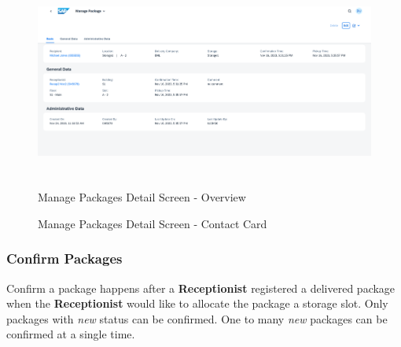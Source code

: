 \begin{figure}[H]
	\centering
	\includegraphics[height=200pt]{images/user_doc/managePack/DetailScreen/browse/overview.png}
	\caption{Manage Packages Detail Screen - Overview}
	\label{fig:MPReportCOntactCard}
\end{figure}

\begin{figure}[H]
	\centering
	\hspace{5pt}
    \caption{Manage Packages Detail Screen - Contact Card}
	\label{fig:MPObjectContactCard}
\end{figure}

\subsubsection{Confirm Packages}

Confirm a package happens after a \textbf{Receptionist} registered a delivered package when the \textbf{Receptionist} would like to allocate the package a storage slot. Only packages with \textit{new} status can be confirmed. One to many \textit{new} packages can be confirmed at a single time.

